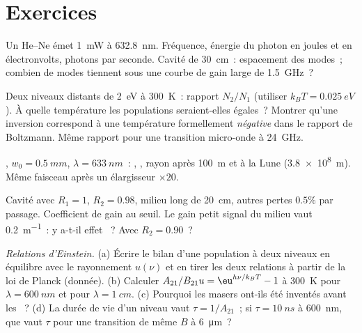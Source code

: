 \section{Exercices}

\begin{exercise}[$\star$]\label{exo:b2:laser:1}
Un  He--Ne émet \qty{1}{mW} à \qty{632.8}{nm}. Fréquence, énergie du
photon en joules et en électronvolts, photons par seconde. Cavité de
\qty{30}{cm}~: espacement des modes~; combien de modes tiennent sous une courbe de gain
large de \qty{1.5}{GHz}~?
\end{exercise}

\begin{exercise}[$\star$]\label{exo:b2:laser:2}
Deux niveaux distants de \qty{2}{eV} à \qty{300}{K}~: rapport $N_2/N_1$ (utiliser
$k_BT = \qty{0.025}{eV}$). À quelle température les populations seraient-elles
égales~? Montrer qu'une inversion correspond à une température formellement \emph{négative}
dans le rapport de Boltzmann. Même rapport pour une transition micro-onde
à \qty{24}{GHz}.
\end{exercise}

\begin{exercise}[$\star$]\label{exo:b2:laser:3}
, $w_0 = \qty{0.5}{mm}$, $\lambda = \qty{633}{nm}$~: , , rayon après \qty{100}{m} et à la Lune
(\qty{3.8e8}{m}). Même faisceau après un élargisseur $\times 20$.
\end{exercise}

\begin{exercise}[$\star$]\label{exo:b2:laser:4}
Cavité avec $R_1 = 1$, $R_2 = 0.98$, milieu long de \qty{20}{cm}, autres
pertes $0.5\%$ par passage. Coefficient de gain au seuil. Le gain petit
signal du milieu vaut \qty{0.2}{m^{-1}}~: y a-t-il effet ~? Avec
$R_2 = 0.90$~?
\end{exercise}

\begin{exercise}[$\star\star$]\label{exo:b2:laser:5}
\emph{Relations d'Einstein.} (a) Écrire le bilan d'une population à deux
niveaux en équilibre avec le rayonnement $u(\nu)$ et en tirer les deux
relations à partir de la loi de Planck (donnée). (b) Calculer
$A_{21}/B_{21}u = \eu^{h\nu/k_BT} - 1$ à \qty{300}{K} pour
$\lambda = \qty{600}{nm}$ et pour $\lambda = \qty{1}{cm}$. (c) Pourquoi les
masers ont-ils été inventés avant les ~? (d) La durée de vie d'un niveau vaut
$\tau = 1/A_{21}$~; si $\tau = \qty{10}{ns}$ à \qty{600}{nm}, que vaut
$\tau$ pour une transition de même $B$ à \qty{6}{\micro m}~?
\end{exercise}

